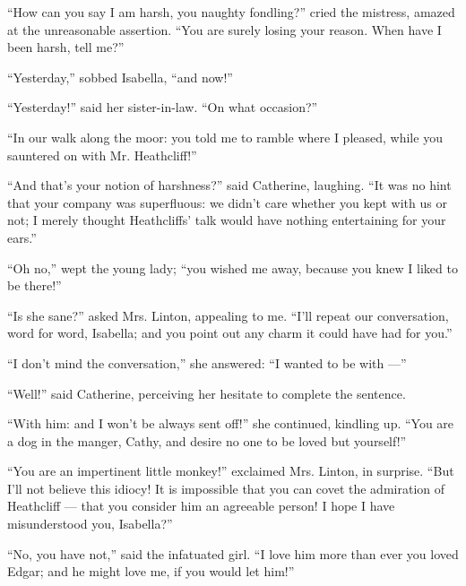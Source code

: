 \par “How can you say I am harsh, you naughty fondling?” cried the mistress, amazed at the unreasonable assertion. “You are surely losing your reason. When have I been harsh, tell me?”
\par “Yesterday,” sobbed Isabella, “and now!”
\par “Yesterday!” said her sister-in-law. “On what occasion?”
\par “In our walk along the moor: you told me to ramble where I pleased, while you sauntered on with Mr. Heathcliff!”
\par “And that's your notion of harshness?” said Catherine, laughing. “It was no hint that your company was superfluous: we didn't care whether you kept with us or not; I merely thought Heathcliffs' talk would have nothing entertaining for your ears.”
\par “Oh no,” wept the young lady; “you wished me away, because you knew I liked to be there!”
\par “Is she sane?” asked Mrs. Linton, appealing to me. “I'll repeat our conversation, word for word, Isabella; and you point out any charm it could have had for you.”
\par “I don't mind the conversation,” she answered: “I wanted to be with —”
\par “Well!” said Catherine, perceiving her hesitate to complete the sentence.
\par “With him: and I won't be always sent off!” she continued, kindling up. “You are a dog in the manger, Cathy, and desire no one to be loved but yourself!”
\par “You are an impertinent little monkey!” exclaimed Mrs. Linton, in surprise. “But I'll not believe this idiocy! It is impossible that you can covet the admiration of Heathcliff — that you consider him an agreeable person! I hope I have misunderstood you, Isabella?”
\par “No, you have not,” said the infatuated girl. “I love him more than ever you loved Edgar; and he might love me, if you would let him!”
